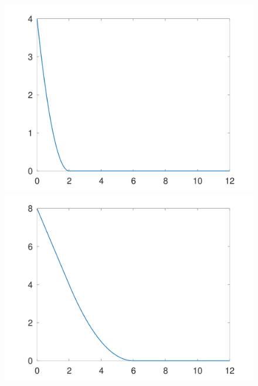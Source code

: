 \documentclass{article}
\begin{document}
  \begin{figure}[!htbp]
    \flushleft
    \subfigure
    {
    \begin{minipage}[b]{.23\linewidth}
      \flushleft
    \includegraphics[scale=0.1]{figures/Assignment_G_N2_0_0.png}
    \end{minipage}
    }
    \subfigure
    {
    \begin{minipage}[b]{.23\linewidth}
      \flushleft
    \includegraphics[scale=0.1]{figures/Assignment_G_N2_1_0.png}
    \end{minipage}
    }
    \subfigure
    {
    \begin{minipage}[b]{.23\linewidth}
      \flushleft

\end{minipage}}
\end{figure}
\end{document}
